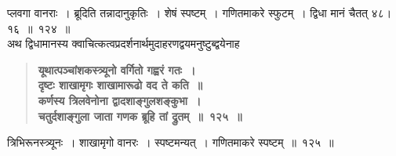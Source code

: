 \documentclass[11pt, openany]{book}
\begin{document}
\begin{sloppypar}
प्लवगा वानराः~। ब्रूदिति तन्नादानुकृतिः~। शेषं स्पष्टम्~। गणितमाकरे स्फुटम्~। द्विधा मानं चैतत् ४८।१६~॥~१२४~॥\\

{\small अथ द्विधामानस्य क्वाचित्कत्वप्रदर्शनार्थमुदाहरणद्वयमनुष्टुब्द्वयेनाह\textendash }

 \label{8.125}
\begin{quote}
{\large \textbf{{\color{purple}यूथात्पञ्चांशकस्त्र्यूनो वर्गितो गह्वरं गतः~।\\
दृष्टः शाखामृगः शाखामारूढो वद ते कति~॥\\
कर्णस्य त्रिलवेनोना द्वादशाङ्गुलशङ्कुभा~।\\
चतुर्दशाङ्गुला जाता गणक ब्रूहि तां द्रुतम्~॥~१२५~॥}}}
\end{quote}

त्रिभिरूनस्त्र्यूनः~। शाखामृगो वानरः~। स्पष्टमन्यत्~। गणितमाकरे स्पष्टम्~॥~१२५~॥
\end{sloppypar}

\newpage
\end{document}
